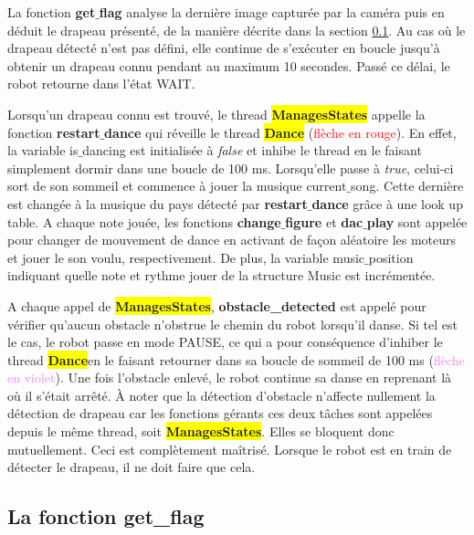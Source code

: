 \documentclass{article}
\newcommand{\state}{\colorbox{yellow}{\textbf{ManagesStates}}}
\newcommand{\dance}{\colorbox{yellow}{\textbf{Dance}}}
\begin{document}
    La fonction \textbf{get$\_$flag} analyse la dernière image capturée par la caméra puis en déduit le drapeau présenté, de la manière décrite dans la section \ref{get_flag}.
    Au cas où le drapeau détecté n'est pas défini, elle continue de s'exécuter en boucle jusqu'à obtenir un drapeau connu pendant au maximum 10 secondes. 
    Passé ce délai, le robot retourne dans l'état \textcolor{bleu}{WAIT}. \\ \par
    
    Lorsqu'un drapeau connu est trouvé, le thread \colorbox{yellow}{\textbf{ManagesStates}} appelle la fonction \textbf{restart$\_$dance} qui réveille le thread \colorbox{yellow}{\textbf{Dance}} (\textcolor{red}{flèche en rouge}). 
    En effet, la variable \textcolor{bleu}{is$\_$dancing} est initialisée à \textit{false} et inhibe le thread en le faisant simplement dormir dans une boucle de 100 ms. 
    Lorsqu'elle passe à \textit{true}, celui-ci sort de son sommeil et commence à jouer la musique \textcolor{bleu}{current$\_$song}.
    Cette dernière est changée à la musique du pays détecté par \textbf{restart$\_$dance} grâce à une look up table. 
    A chaque note jouée, les fonctions \textbf{change$\_$figure} et \textbf{dac$\_$play} sont appelée pour changer de mouvement de dance en activant de façon aléatoire les moteurs et jouer le son voulu, respectivement. 
    De plus, la variable \textcolor{bleu}{music$\_$position} indiquant quelle note et rythme jouer de la structure \textcolor{bleu}{Music} est incrémentée. \\ \par
    
    A chaque appel de \state, \textbf{obstacle\_detected} est appelé pour vérifier qu'aucun obstacle n'obstrue le chemin du robot lorsqu'il danse. 
    Si tel est le cas, le robot passe en mode \textcolor{bleu}{PAUSE}, ce qui a pour conséquence d'inhiber le thread \dance en le faisant retourner dans sa boucle de sommeil de 100 ms (\textcolor{violet}{flèche en violet}). 
    Une fois l'obstacle enlevé, le robot continue sa danse en reprenant là où il s'était arrêté. 
    À noter que la détection d'obstacle n'affecte nullement la détection de drapeau car les fonctions gérants ces deux tâches sont appelées depuis le même thread, soit \state.
    Elles se bloquent donc mutuellement.
    Ceci est complètement maîtrisé.
    Lorsque le robot est en train de détecter le drapeau, il ne doit faire que cela.

    \subsection{La fonction get\_flag}
    \label{get_flag}
    
\end{document}
